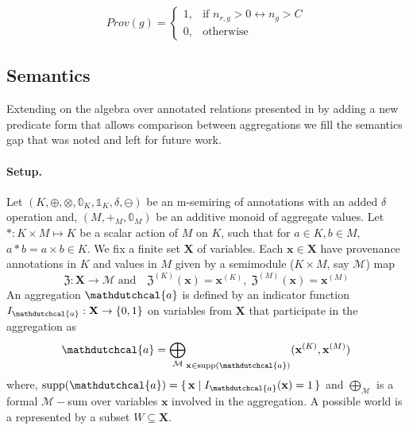 \documentclass[10pt,a4paper]{scrartcl}
\theoremstyle{definition}
\theoremstyle{remark}
\begin{document}
$$Prov(g) = \begin{cases}
   1, & \text{if } n_{r, g} > 0 \leftrightarrow n_g > C \\
   0, & \text{otherwise}
   \end{cases}$$

\subsection{Semantics}
Extending on the algebra over annotated 
relations presented in \cite{sen2025provsqlgeneralkeepingtrack} by 
adding a new predicate form that allows 
comparison between aggregations we fill the semantics gap that 
was noted and left for future work.
\paragraph{Setup.}
Let $(K,\oplus,\otimes,\mathbb{0}_K,\mathbb{1}_K,\delta,\ominus)$ be an m-semiring of annotations with an 
added $\delta$ operation and, $(M,+_M,\mathbb{0}_M)$ be an 
additive monoid of aggregate values. Let $*:K\times M \mapsto K$ be a scalar action of $M$ on $K$, such that for $a \in K, b \in M$, 
$a * b = a \times b \in K$.
We fix a finite set $\mathbf{X}$ of variables. Each $\mathbf{x}\in\mathbf{X}$ have provenance annotations in $K$ and values in $M$ 
given by a semimodule ($K\times M$, say $\mathcal{M}$) map 
\[
\mathfrak{Z}:\mathbf{X}\rightarrow \mathcal{M}\; \text{and} \quad \mathfrak{Z}^{(K)}(\mathbf{x})=\mathbf{x}^{(K)}, \; \mathfrak{Z}^{(M)}(\mathbf{x})=\mathbf{x}^{(M)}
\]
An aggregation $\mathdutchcal{a}$ is defined by an indicator function 
$I_\mathdutchcal{a}:\mathbf{X}\rightarrow \{0,1\}$
on variables from $\mathbf{X}$ that participate in the aggregation as 
\[
\mathdutchcal{a} = {\bigoplus_\mathcal{M}}_{\mathbf{x}\in \mathrm{supp}(\mathdutchcal{a})}(\mathbf{x}^{(K)},\mathbf{x}^{(M)})
\]
where, 
$\mathrm{supp}(\mathdutchcal{a})=\{\,\mathbf{x} \mid I_\mathdutchcal{a}(\mathbf{x})=1 \,\}$ and 
$\bigoplus_{\mathcal{M}}$ is a formal $\mathcal{M}-$sum over 
variables $\mathbf{x}$ involved in the aggregation.
A possible world is a represented by a subset $W\subseteq\mathbf{X}$.
\end{document}
